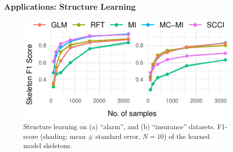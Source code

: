 \documentclass{beamer}
\begin{document}
\begin{frame}
	\frametitle{Applications: Structure Learning}
	\begin{figure}
		\centering
		\includegraphics{imgs/sl.pdf}
		\caption*{Structure learning on (a) ``alarm'', and (b)
		``insurance'' datasets.  F1-score (shading: mean $\pm$ standard
		error, $N=10$) of the learned model skeletons.}
	\end{figure}
\end{frame}
\end{document}
